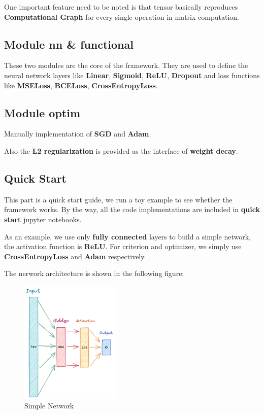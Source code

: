 \documentclass[a4paper, 11pt]{article} %
\begin{document}
One important feature need to be noted is that tensor basically reproduces
\textbf{Computational Graph} for every single operation in matrix computation.

\subsection{\textbf{Module nn \& functional}}

These two modules are the core of the framework. They are used to define the neural network
layers like \textbf{Linear}, \textbf{Sigmoid}, \textbf{ReLU}, \textbf{Dropout} and loss
functions like \textbf{MSELoss}, \textbf{BCELoss}, \textbf{CrossEntropyLoss}.

\subsection{\textbf{Module optim}}

Manually implementation of \textbf{SGD} and \textbf{Adam}.

Also the \textbf{L2 regularization} is provided as the interface of \textbf{weight decay}.

\subsection{\textbf{Quick Start}}

This part is a quick start guide, we run a toy example to see whether the framework works. By
the way, all the code implementations are included in \textbf{quick start} jupyter notebooks.

As an example, we use only \textbf{fully connected} layers to build a simple network, the
activation function is \textbf{ReLU}. For criterion and optimizer, we simply use
\textbf{CrossEntropyLoss} and \textbf{Adam} respectively.

The nerwork architecture is shown in the following figure:

\begin{figure}[H]
	\centering
	\includegraphics[width=0.42\textwidth]{./img/simple-network.png}
	\caption{Simple Network}
\end{figure}
\end{document}
